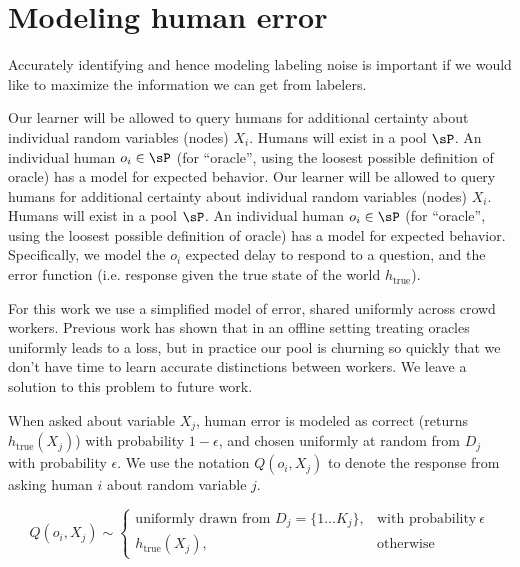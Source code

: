\section{Modeling human error}
\label{sec:human-error}


Accurately identifying and hence modeling labeling noise is important if we would like to maximize the information we can get from labelers.



Our learner will be allowed to query humans for additional certainty about individual random variables (nodes) $X_i$.
 Humans will exist in a pool $\sP$.
 An individual human $o_i \in \sP$ (for ``oracle'', using the loosest possible definition of oracle) has a model for expected behavior.
Our learner will be allowed to query humans for additional certainty about individual random variables (nodes) $X_i$.
 Humans will exist in a pool $\sP$.
 An individual human $o_i \in \sP$ (for ``oracle'', using the loosest possible definition of oracle) has a model for expected behavior. Specifically, we model the $o_i$ expected delay to respond to a question, and the error function (i.e. response given the true state of the world $h_{\text{true}}$).

For this work we use a simplified model of error, shared uniformly across crowd workers.
 Previous work \cite{yan2011active} \cite{donmez2008proactive} \cite{golovin2010near} has shown that in an offline setting treating oracles uniformly leads to a loss, but in practice our pool is churning so quickly that we don't have time to learn accurate distinctions between workers.
 We leave a solution to this problem to future work.

When asked about variable $X_j$, human error is modeled as correct (returns $h_{\text{true}}(X_j)$) with probability $1-\epsilon$, and chosen uniformly at random from $D_j$ with probability $\epsilon$.
 We use the notation $Q(o_i, X_j)$ to denote the response from asking human $i$ about random variable $j$.

\begin{equation}
    Q(o_i, X_j) \sim
    \begin{cases}
       \text{uniformly drawn from } D_j = \{1 \ldots K_j\}, & \text{with probability}\ \epsilon \\
      h_{\text{true}}(X_j), & \text{otherwise}
    \end{cases}
 \end{equation}
 
